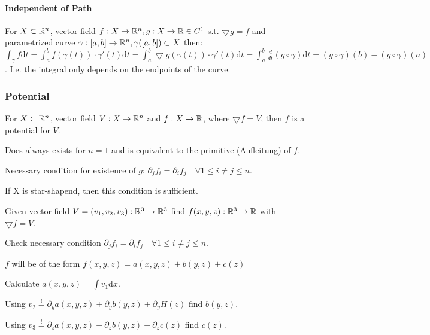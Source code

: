\paragraph{Independent of Path}
For $X \subset \mathbb{R}^n$, vector field $f: X \to \mathbb{R}^n, g: X \to \mathbb{R} \in C^1$ s.t. $\bigtriangledown g = f$ and parametrized curve $\gamma: [a, b] \to \mathbb{R}^n, \gamma([a, b]) \subset X$ then: $\int_{\gamma} f \mathrm{d}t = \int_{a}^{b} f(\gamma(t)) \cdot \gamma'(t) \mathrm{d}t = \int_{a}^{b} \bigtriangledown g(\gamma(t)) \cdot \gamma'(t) \mathrm{d}t = \int_{a}^{b} \frac{d}{dt} (g \circ \gamma) \mathrm{d}t = (g \circ \gamma)(b) - (g \circ \gamma)(a)$. I.e. the integral only depends on the endpoints of the curve.

\subsubsection{Potential}
For $X \subset \mathbb{R}^n$, vector field $V: X \to \mathbb{R}^n$ and $f: X \to \mathbb{R}$, where $\bigtriangledown f = V$, then $f$ is a potential for $V$.

\begin{compactitem}
    \item Does always exists for $n = 1$ and is equivalent to the primitive (Aufleitung) of $f$.
    \item Necessary condition for existence of $g$: $\partial_j f_i = \partial_i f_j \quad \forall 1 \le i \neq j \le n$.
        \begin{compactitem}
            \item If X is star-shapend, then this condition is sufficient.
        \end{compactitem}
\end{compactitem}

Given vector field $V = (v_1, v_2, v_3): \mathbb{R}^3 \to \mathbb{R}^3$ find $f(x, y, z): \mathbb{R}^3 \to \mathbb{R}$ with $\bigtriangledown f = V$.

\begin{compactenum}
    \item Check necessary condition $\partial_j f_i = \partial_i f_j \quad \forall 1 \le i \neq j \le n$.
\end{compactenum}

$f$ will be of the form $f(x, y, z) = a(x, y, z) + b(y, z) + c(z)$

\begin{compactenum}
    \item Calculate $a(x, y, z) = \int v_1 \mathrm{d}x$.
    \item Using $v_2 \overset{!}{=} \partial_y a(x, y, z) + \partial_y b(y, z) + \partial_y H(z)$ find $b(y, z)$.
    \item Using $v_3 \overset{!}{=} \partial_z a(x, y, z) + \partial_z b(y, z) + \partial_z c(z)$ find $c(z)$.
\end{compactenum}

